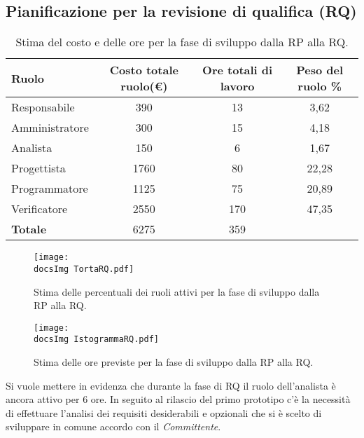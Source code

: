 {{	}
	\newpage
	\subsection{Pianificazione per la revisione di qualifica (RQ)}{
	\begin{table}[h!]
		\begin{center}
			\begin{tabular}{l c c c}				
				\toprule
				Ruolo&	 Costo totale ruolo(\euro) 	&	Ore totali di lavoro &	Peso del ruolo \% \\ 
				\midrule
			Responsabile	&	390&		13&	3,62 \\
			Amministratore&	300&		15&	4,18 \\
			Analista	&	150&		6&	1,67\\
			Progettista&		1760	&	80&	22,28\\
			Programmatore&	1125	&	75&	20,89\\
			Verificatore	&	2550&	170&		47,35\\ \hline
				\textbf{Totale}&		6275&	359	&\\
				\bottomrule
			\end{tabular}
		\end{center}	
		\caption{Stima del costo e delle ore per la fase di sviluppo dalla RP alla RQ.}
	\end{table}
	\begin{figure}[h!]
	\centering
		\texttt{[image: \\docsImg TortaRQ.pdf]}
		\caption{Stima delle percentuali dei ruoli attivi per la fase di sviluppo dalla RP alla RQ.}  		
		\texttt{[image: \\docsImg IstogrammaRQ.pdf]}

	\caption{Stima delle ore previste per la fase di sviluppo dalla RP alla RQ.}
	
	\end{figure} 	
	Si vuole mettere in evidenza che durante la fase di RQ il ruolo dell'analista è ancora attivo per 6 ore. In seguito al rilascio del primo prototipo c'è la necessità di effettuare l'analisi dei requisiti desiderabili e opzionali che si è scelto di sviluppare in comune accordo con il \textit{Committente}.
	
}}
